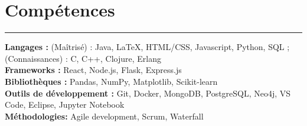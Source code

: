 \documentclass[10pt]{article}
\begin{document}
\section*{Compétences}
\vspace{-2mm}
\hrule
\vspace{0mm}
\textbf{Langages :} (Maîtrisé) : Java, LaTeX, HTML/CSS, Javascript, Python, SQL ; (Connaissances) : C, C++, Clojure, Erlang \\
\textbf{Frameworks :} React, Node.js, Flask, Express.js  \\
\textbf{Bibliothèques :} Pandas, NumPy, Matplotlib, Scikit-learn \\
\textbf{Outils de développement :} Git, Docker, MongoDB, PostgreSQL, Neo4j, VS Code, Eclipse, Jupyter Notebook \\
\textbf{Méthodologies:} Agile development, Scrum, Waterfall
\end{document}
